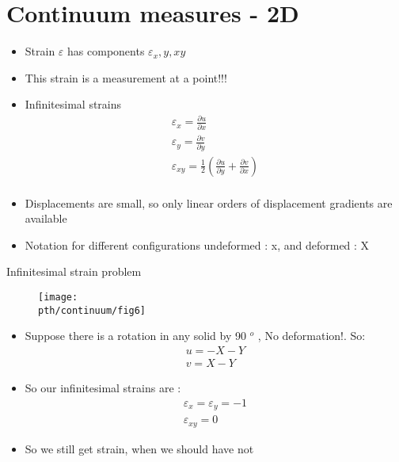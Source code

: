 \section{Continuum measures - 2D}

	\begin{frame}
		\begin{block}{}
			\begin{itemize}
				\item Strain $\varepsilon$ has components $\varepsilon_x,y,xy$
				 \item This strain is a measurement at a point!!!
				 \item Infinitesimal strains 
				 \begin{align*}
				 	\varepsilon_x = \frac{\partial u}{\partial x} \\
					\varepsilon_y = \frac{\partial v}{\partial y} \\
					\varepsilon_{xy} = \frac{1}{2}\left( \frac{\partial u}{\partial y} + \frac{\partial v}{\partial x}\right) \\
				 \end{align*}
				
			\end{itemize}
		\end{block}
	\begin{itemize}
		\item Displacements are small, so only linear orders of displacement gradients are available
		\item Notation for different configurations undeformed : x, and deformed : X
		
	\end{itemize}
	\end{frame}

	\begin{frame}{Infinitesimal strain problem}
		\begin{figure}
			\centering
			\texttt{[image: \\pth/continuum/fig6]}
			\label{fig:fig1}
		\end{figure}
		\begin{block}{}
			\begin{itemize}
				\item Suppose there is a rotation in any solid by 90 $^o$ , No deformation!. So:
				\begin{align*}
					u = -X - Y \\
					v = X - Y 
				\end{align*}
				\item So our infinitesimal strains are :
				\begin{align*}
					\varepsilon_x = \varepsilon_y = -1 \\  \varepsilon_{xy} = 0
				\end{align*}		
				\item So we still get strain, when we should have not
			\end{itemize}
		\end{block}
	\end{frame}

